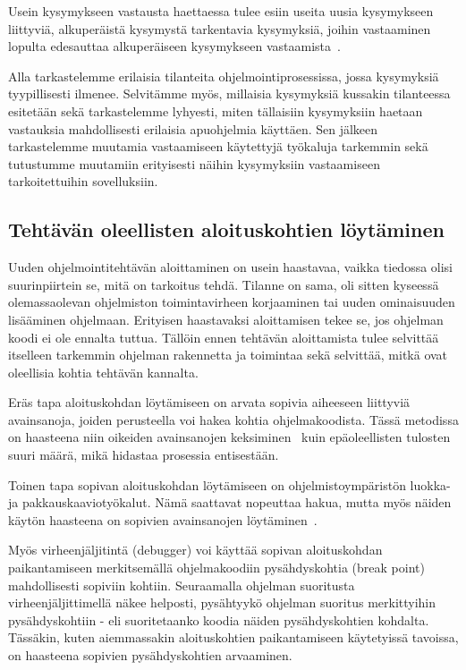 \documentclass[finnish]{tktltiki2}
\theoremstyle{definition}
\theoremstyle{remark}
\begin{document}
Usein kysymykseen vastausta haettaessa tulee esiin useita uusia kysymykseen liittyviä, alkuperäistä kysymystä tarkentavia kysymyksiä, joihin vastaaminen lopulta edesauttaa alkuperäiseen kysymykseen vastaamista~\cite{questions-during-software-evolution-tasks}.

Alla tarkastelemme erilaisia tilanteita ohjelmointiprosessissa, jossa kysymyksiä tyypillisesti ilmenee. Selvitämme myös, millaisia kysymyksiä kussakin tilanteessa esitetään sekä tarkastelemme lyhyesti, miten tällaisiin kysymyksiin haetaan vastauksia mahdollisesti erilaisia apuohjelmia käyttäen. Sen jälkeen tarkastelemme muutamia vastaamiseen käytettyjä työkaluja tarkemmin sekä tutustumme muutamiin erityisesti näihin kysymyksiin vastaamiseen tarkoitettuihin sovelluksiin.

\subsection{Tehtävän oleellisten aloituskohtien löytäminen}
Uuden ohjelmointitehtävän aloittaminen on usein haastavaa, vaikka tiedossa olisi suurinpiirtein se, mitä on tarkoitus tehdä. Tilanne on sama, oli sitten kyseessä olemassaolevan ohjelmiston toimintavirheen korjaaminen tai uuden ominaisuuden lisääminen ohjelmaan. Erityisen haastavaksi aloittamisen tekee se, jos ohjelman koodi ei ole ennalta tuttua. Tällöin ennen tehtävän aloittamista tulee selvittää itselleen tarkemmin ohjelman rakennetta ja toimintaa sekä selvittää, mitkä ovat oleellisia kohtia tehtävän kannalta.

Eräs tapa aloituskohdan löytämiseen on arvata sopivia aiheeseen liittyviä avainsanoja, joiden perusteella voi hakea kohtia ohjelmakoodista. Tässä metodissa on haasteena niin oikeiden avainsanojen keksiminen~\cite{what-to-search-for} kuin epäoleellisten tulosten suuri määrä, mikä hidastaa prosessia entisestään.

Toinen tapa sopivan aloituskohdan löytämiseen on ohjelmistoympäristön luokka- ja pakkauskaaviotyökalut. Nämä saattavat nopeuttaa hakua, mutta myös näiden käytön haasteena on sopivien avainsanojen löytäminen~\cite{what-to-search-for}.

Myös virheenjäljitintä (debugger) voi käyttää sopivan aloituskohdan paikantamiseen merkitsemällä ohjelmakoodiin pysähdyskohtia (break point) mahdollisesti sopiviin kohtiin. Seuraamalla ohjelman suoritusta virheenjäljittimellä näkee helposti, pysähtyykö ohjelman suoritus merkittyihin pysähdyskohtiin - eli suoritetaanko koodia näiden pysähdyskohtien kohdalta. Tässäkin, kuten aiemmassakin aloituskohtien paikantamiseen käytetyissä tavoissa, on haasteena sopivien pysähdyskohtien arvaaminen.
\end{document}
